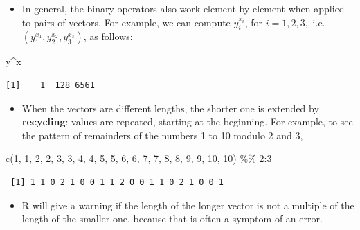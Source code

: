\documentclass[
  9pt,
  a4paper,
  ignorenonframetext,
  notheorems]{beamer}
\newenvironment{Shaded}{\begin{snugshade}}{\end{snugshade}}
\newcommand{\DecValTok}[1]{\textcolor[rgb]{0.68,0.00,0.00}{#1}}
\newcommand{\FunctionTok}[1]{\textcolor[rgb]{0.28,0.35,0.67}{#1}}
\newcommand{\NormalTok}[1]{\textcolor[rgb]{0.00,0.23,0.31}{#1}}
\newcommand{\SpecialCharTok}[1]{\textcolor[rgb]{0.37,0.37,0.37}{#1}}
\providecommand{\tightlist}{%
  \setlength{\itemsep}{0pt}\setlength{\parskip}{0pt}}\usepackage{longtable,booktabs,array}
\begin{document}
\begin{frame}[fragile]
\begin{itemize}
\tightlist
\item
  In general, the binary operators also work element-by-element when
  applied to pairs of vectors. For example, we can compute
  \(y_i^{x_i}\), for \(i=1,2,3,\)
  i.e.~\((y_1^{x_1}, y_2^{x_2}, y_3^{x_3})\), as follows:
\end{itemize}

\begin{Shaded}
\begin{Highlighting}[]
\NormalTok{y}\SpecialCharTok{\^{}}\NormalTok{x}
\end{Highlighting}
\end{Shaded}

\begin{verbatim}
[1]    1  128 6561
\end{verbatim}

\begin{itemize}
\tightlist
\item
  When the vectors are different lengths, the shorter one is extended by
  \textbf{recycling}: values are repeated, starting at the beginning.
  For example, to see the pattern of remainders of the numbers 1 to 10
  modulo 2 and 3,
\end{itemize}

\begin{Shaded}
\begin{Highlighting}[]
\FunctionTok{c}\NormalTok{(}\DecValTok{1}\NormalTok{, }\DecValTok{1}\NormalTok{, }\DecValTok{2}\NormalTok{, }\DecValTok{2}\NormalTok{, }\DecValTok{3}\NormalTok{, }\DecValTok{3}\NormalTok{, }\DecValTok{4}\NormalTok{, }\DecValTok{4}\NormalTok{, }\DecValTok{5}\NormalTok{, }\DecValTok{5}\NormalTok{, }\DecValTok{6}\NormalTok{, }\DecValTok{6}\NormalTok{, }\DecValTok{7}\NormalTok{, }\DecValTok{7}\NormalTok{, }\DecValTok{8}\NormalTok{, }\DecValTok{8}\NormalTok{, }\DecValTok{9}\NormalTok{, }\DecValTok{9}\NormalTok{, }\DecValTok{10}\NormalTok{, }\DecValTok{10}\NormalTok{) }\SpecialCharTok{\%\%} \DecValTok{2}\SpecialCharTok{:}\DecValTok{3}
\end{Highlighting}
\end{Shaded}

\begin{verbatim}
 [1] 1 1 0 2 1 0 0 1 1 2 0 0 1 1 0 2 1 0 0 1
\end{verbatim}

\begin{itemize}
\tightlist
\item
  R will give a warning if the length of the longer vector is not a
  multiple of the length of the smaller one, because that is often a
  symptom of an error.
\end{itemize}


\end{frame}
\end{document}
